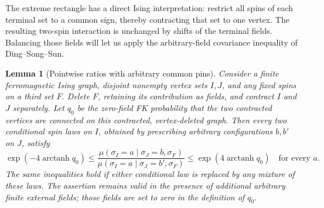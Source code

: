 \documentclass[11pt]{article}
\newtheorem{lemma}[theorem]{Lemma}
\theoremstyle{definition}
\theoremstyle{remark}
\numberwithin{equation}{section}
\begin{document}
The extreme rectangle has a direct Ising interpretation: restrict all
spins of each terminal set to a common sign, thereby contracting that set
to one vertex. The resulting two-spin interaction is unchanged by shifts
of the terminal fields. Balancing those fields will let us apply the
arbitrary-field covariance inequality of Ding--Song--Sun.

\begin{lemma}[Pointwise ratios with arbitrary common pins]
\label{fd:ratio}
Consider a finite ferromagnetic Ising graph, disjoint nonempty vertex sets
\(I,J\), and any fixed spins on a third set \(F\).
Delete \(F\), retaining its contribution as fields, and contract \(I\)
and \(J\) separately.  Let \(q_0\) be the zero-field FK probability that
the two contracted vertices are connected on this contracted, vertex-deleted
graph.  Then every two conditional spin laws on \(I\), obtained by
prescribing arbitrary configurations \(b,b'\) on \(J\), satisfy
\begin{equation}
 \exp(-4\operatorname{arctanh}q_0)
 \le\frac{\mu(\sigma_I=a\mid\sigma_J=b,\sigma_F)}
            {\mu(\sigma_I=a\mid\sigma_J=b',\sigma_F)}
 \le\exp(4\operatorname{arctanh}q_0)
 \quad\text{for every }a.
 \label{fd:pointwise-ratio}
\end{equation}
The same inequalities hold if either conditional law is replaced by any
mixture of these laws.  The assertion remains valid in the presence of
additional arbitrary finite external fields; those fields are set to zero
in the definition of \(q_0\).
\end{lemma}
\end{document}
